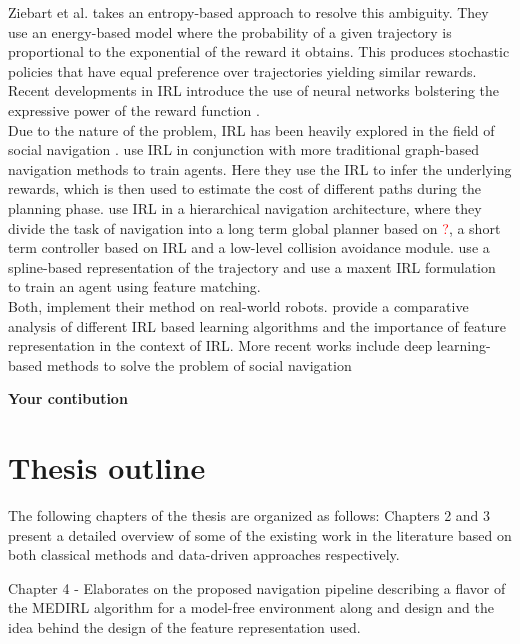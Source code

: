 Ziebart et al. \cite{ziebart_maxent_2008} takes an entropy-based approach to resolve this ambiguity. They use an energy-based model where the probability of a given trajectory is proportional to the exponential of the reward it obtains. This produces stochastic policies that have equal preference over trajectories yielding similar rewards. Recent developments in IRL introduce the use of neural networks bolstering the expressive power of the reward function \cite{wulfmeier2015maxmium}. \\

Due to the nature of the problem, IRL has been heavily explored in the field of social navigation \cite{kuderer_socially_nodate , kretzschmar_socially_2016 }. \cite{shiarlis_rapidly_2017, okal_efcient_nodate} use IRL in conjunction with more traditional graph-based navigation methods to train agents. Here they use the IRL to infer the underlying rewards, which is then used to estimate the cost of different paths during the planning phase. \cite{kim_socially_2016} use IRL in a hierarchical navigation architecture, where they divide the task of navigation into a long term global planner based on \textcolor{red}{?}, a short term controller based on IRL and a low-level collision avoidance module. \cite{kretzschmar_socially_2016} use a spline-based representation of the trajectory and use a maxent IRL formulation to train an agent using feature matching. 
\\
Both,\cite{kim_socially_2016, kretzschmar_socially_2016} implement their method on real-world robots. \cite{vasquez_inverse_2014} provide a comparative analysis of different IRL based learning algorithms and the importance of feature representation in the context of IRL. More recent works include deep learning-based methods to solve the problem of social navigation \cite{fahad_learning_2018, wulfmeier2015maximum}

\textbf{Your contibution}

\section{Thesis outline}


The following chapters of the thesis are organized as follows:
Chapters 2 and 3 present a detailed overview of some of the existing work in the literature based on both classical methods and data-driven approaches respectively.

Chapter 4 - Elaborates on the proposed navigation pipeline describing a flavor of the MEDIRL algorithm for a model-free environment along and design and the idea behind the design of the feature representation used.

